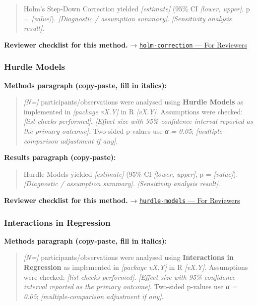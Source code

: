 \documentclass[
]{article}
\begin{document}
\begin{quote}
Holm's Step-Down Correction yielded \emph{{[}estimate{]}} (95\% CI
\emph{{[}lower, upper{]}}, p = \emph{{[}value{]}}). \emph{{[}Diagnostic
/ assumption summary{]}}. \emph{{[}Sensitivity analysis result{]}}.
\end{quote}

\textbf{Reviewer checklist for this method.} →
\href{../chapters/04-inferential/holm-correction.Rmd\#for-reviewers}{\texttt{holm-correction}
--- For Reviewers}

\subsubsection{Hurdle Models}\label{hurdle-models}

\textbf{Methods paragraph (copy-paste, fill in italics):}

\begin{quote}
\emph{{[}N={]}} participants/observations were analysed using
\textbf{Hurdle Models} as implemented in \emph{{[}package vX.Y{]}} in R
\emph{{[}vX.Y{]}}. Assumptions were checked: \emph{{[}list checks
performed{]}}. \emph{{[}Effect size with 95\% confidence interval
reported as the primary outcome{]}}. Two-sided p-values use \emph{α =
0.05}; \emph{{[}multiple-comparison adjustment if any{]}}.
\end{quote}

\textbf{Results paragraph (copy-paste):}

\begin{quote}
Hurdle Models yielded \emph{{[}estimate{]}} (95\% CI \emph{{[}lower,
upper{]}}, p = \emph{{[}value{]}}). \emph{{[}Diagnostic / assumption
summary{]}}. \emph{{[}Sensitivity analysis result{]}}.
\end{quote}

\textbf{Reviewer checklist for this method.} →
\href{../chapters/07-regression/hurdle-models.Rmd\#for-reviewers}{\texttt{hurdle-models}
--- For Reviewers}

\subsubsection{Interactions in
Regression}\label{interactions-in-regression}

\textbf{Methods paragraph (copy-paste, fill in italics):}

\begin{quote}
\emph{{[}N={]}} participants/observations were analysed using
\textbf{Interactions in Regression} as implemented in \emph{{[}package
vX.Y{]}} in R \emph{{[}vX.Y{]}}. Assumptions were checked: \emph{{[}list
checks performed{]}}. \emph{{[}Effect size with 95\% confidence interval
reported as the primary outcome{]}}. Two-sided p-values use \emph{α =
0.05}; \emph{{[}multiple-comparison adjustment if any{]}}.
\end{quote}
\end{document}

